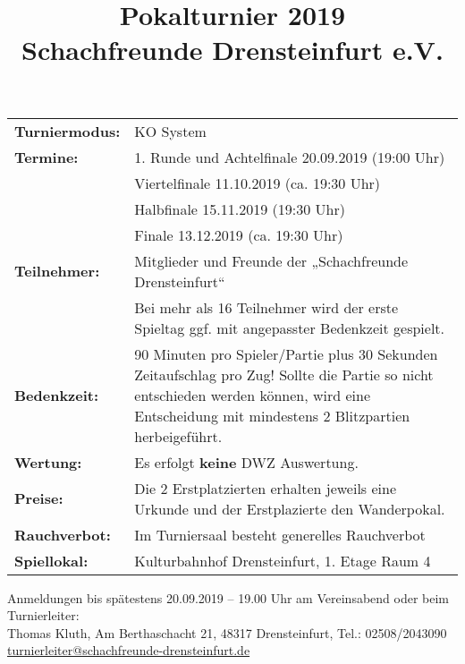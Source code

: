 \documentclass[a4paper,parskip=full-,DIV18]{scrartcl}
\title{Pokalturnier 2019\\Schachfreunde Drensteinfurt e.V.}
\date{}
\begin{document}
\maketitle


\bigskip

\begin{tabular}{p{3 cm} p{13.5 cm}}
	\textbf{Turniermodus:} & KO System                                                                                 \\
	\textbf{Termine:}      & 1. Runde und Achtelfinale 20.09.2019 (19:00 Uhr)                                           \\
	                       & Viertelfinale 11.10.2019 (ca. 19:30 Uhr)                                                   \\
	                       & Halbfinale 15.11.2019 (19:30 Uhr)                                                          \\
	                       & Finale 13.12.2019 (ca. 19:30 Uhr)                                                          \\
	\textbf{Teilnehmer:}   & Mitglieder und Freunde der „Schachfreunde Drensteinfurt“                                   \\
	\textbf{}              & Bei mehr als 16 Teilnehmer wird der erste Spieltag ggf. mit angepasster Bedenkzeit gespielt.\\
	\textbf{Bedenkzeit:}   & 90 Minuten pro Spieler/Partie plus 30 Sekunden Zeitaufschlag pro Zug! Sollte die Partie so nicht entschieden werden können, wird eine Entscheidung mit  mindestens 2 Blitzpartien herbeigeführt.                      \\
	\textbf{Wertung:}      & Es erfolgt \textbf{keine} DWZ Auswertung.                                                  \\
	\textbf{Preise:}       & Die 2 Erstplatzierten erhalten jeweils eine Urkunde und der Erstplazierte den Wanderpokal. \\
	\textbf{Rauchverbot:}  & Im Turniersaal besteht generelles Rauchverbot                                              \\
	\textbf{Spiellokal:}   & Kulturbahnhof Drensteinfurt, 1. Etage Raum 4
\end{tabular}


\bigskip

Anmeldungen bis spätestens 20.09.2019 – 19.00 Uhr am Vereinsabend oder beim Turnierleiter:\\
Thomas Kluth, Am Berthaschacht 21, 48317 Drensteinfurt, Tel.: 02508/2043090\\
\href{mailto:turnierleiter@schachfreunde-drensteinfurt.de}{turnierleiter@schachfreunde-drensteinfurt.de}
\end{document}
